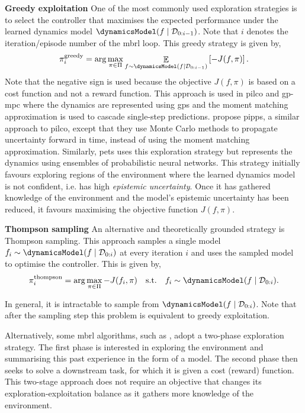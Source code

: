 \documentclass{mimosis-class/mimosis}
\numberwithin{equation}{chapter}
\DeclareMathOperator{\E}{\mathbb{E}}
\begin{document}
\textbf{Greedy exploitation}
One of the most commonly used exploration strategies is to select the controller that maximises
the expected performance under the learned dynamics model \(\dynamicsModel(f \mid \mathcal{D}_{0:i-1})\).
Note that \(i\) denotes the iteration/episode number of the \acrshort{mbrl} loop.
This greedy strategy is given by,
\begin{align} \label{eq-greedy-exploration}
\pi_i^{\text{greedy}} = \arg \max_{\pi \in \Pi} \E_{f \sim \dynamicsModel(f \mid \mathcal{D}_{0:i-1})} \left[ -J(f, \pi) \right].
\end{align}
Note that the negative sign is used because the objective \(J(f, \pi)\) is based on a cost function and not a reward
function.
This approach is used in \acrshort{pilco} \citep{deisenrothPILCO2011} and \acrshort{gp}-\acrshort{mpc} \citep{kamtheDataEfficient2018}
where the dynamics are represented using \acrshort{gps} and the moment matching approximation is used to cascade
single-step predictions.
\cite{parmasPIPPS2018} propose \acrshort{pipps},
a similar approach to \acrshort{pilco}, except that they use Monte Carlo methods
to propagate uncertainty forward in time, instead of using the moment matching approximation.
Similarly, \acrshort{pets} \citep{chuaDeep2018} uses this exploration strategy but represents the dynamics
using ensembles of probabilistic neural networks.
This strategy initially favours exploring regions of the environment where the learned dynamics
model is not confident, i.e. has high \emph{epistemic uncertainty}.
Once it has gathered knowledge of the environment and the model’s
epistemic uncertainty has been reduced, it favours maximising the objective function \(J(f, \pi)\).

\textbf{Thompson sampling}
An alternative and theoretically grounded strategy is Thompson sampling.
This approach samples a single model  \(f_i \sim \dynamicsModel(f \mid \mathcal{D}_{0:i})\) at every iteration \(i\)
and uses the sampled model to optimise the controller.
This is given by,
\begin{align} \label{eq-thompson-exploration}
\pi_i^{\text{thompson}} = \arg \max_{\pi \in \Pi} -J(f_i, \pi) \quad \text{s.t.} \quad f_i \sim \dynamicsModel(f \mid \mathcal{D}_{0:i}).
\end{align}

In general, it is intractable to sample from \(\dynamicsModel(f \mid \mathcal{D}_{0:i})\).
Note that after the sampling step this problem is equivalent to greedy exploitation.

Alternatively, some \acrshort{mbrl} algorithms, such as \cite{sekarPlanning2020}, adopt a two-phase exploration strategy.
The first phase is interested in exploring the environment and summarising this past experience in the form of a model.
The second phase then seeks to solve a downstream task, for which it is given a cost (reward) function.
This two-stage approach does not require an objective that changes its exploration-exploitation balance as
it gathers more knowledge of the environment.
\end{document}
